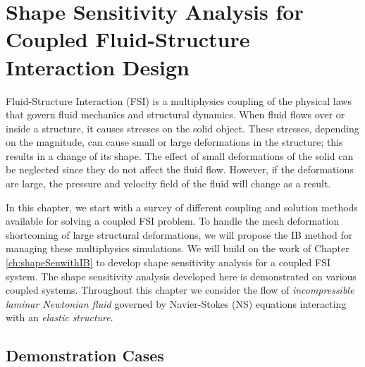 \chapter{Shape Sensitivity Analysis for Coupled Fluid-Structure Interaction Design}\label{ch:FSIsen}
Fluid-Structure Interaction (FSI) is a multiphysics coupling of the physical laws that govern fluid mechanics and structural dynamics. When fluid flows over or inside a structure, it causes stresses on the solid object. These stresses, depending on the magnitude,  can cause small or large deformations in the structure; this results in a change of its shape. The effect of small deformations of the solid can be neglected since they do not affect the fluid flow. However, if the deformations are large, the pressure and velocity field of the fluid will change as a result.

In this chapter, we start with a survey of different coupling and solution methods available for solving a coupled FSI problem. To handle the mesh deformation shortcoming of large structural deformations, we will propose the IB method for managing these multiphysics simulations. We will build on the work of Chapter \ref{ch:shapeSenwithIB} to develop shape sensitivity analysis for a coupled FSI system. The shape sensitivity analysis developed here is demonstrated on various coupled systems. Throughout this chapter we consider the flow of \emph{incompressible laminar Newtonian fluid} governed by Navier-Stokes (NS) equations interacting with an \emph{elastic structure}. 



\section{Demonstration Cases}



